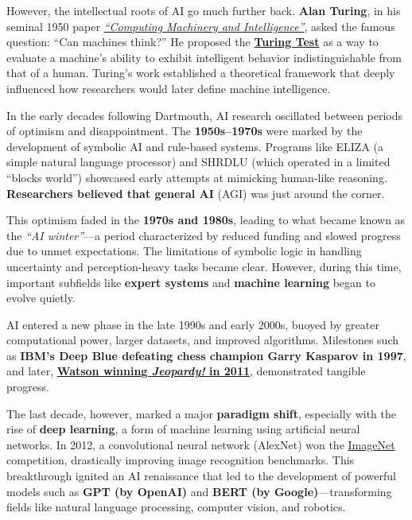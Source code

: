 \documentclass[
]{book}
\begin{document}
However, the intellectual roots of AI go much further back. \textbf{Alan Turing},
in his seminal 1950 paper \href{https://academic.oup.com/mind/article-abstract/LIX/236/433/986238?redirectedFrom=fulltext}{\emph{``Computing Machinery and Intelligence''}},
asked the
famous question: ``Can machines think?'' He proposed the \href{https://en.wikipedia.org/wiki/Turing_test}{\textbf{Turing Test}}
as a way to evaluate a machine's ability to exhibit intelligent behavior
indistinguishable from that of a human. Turing's work established a
theoretical framework that deeply influenced how researchers would later
define machine intelligence.

In the early decades following Dartmouth, AI research oscillated between
periods of optimism and disappointment.
The \textbf{1950s--1970s} were marked by the development of symbolic AI and
rule-based systems. Programs like ELIZA (a simple natural language processor)
and SHRDLU (which operated in a limited ``blocks world'') showcased early
attempts at mimicking human-like reasoning. \textbf{Researchers believed that general
AI} (AGI) was just around the corner.

This optimism faded in the \textbf{1970s and 1980s}, leading to what became known
as the \emph{``AI winter''}---a period characterized by reduced funding and slowed
progress due to unmet expectations. The limitations of symbolic logic
in handling uncertainty and perception-heavy tasks became clear.
However, during this time, important subfields like \textbf{expert systems}
and \textbf{machine learning} began to evolve quietly.

AI entered a new phase in the late 1990s and early 2000s, buoyed by greater
computational power, larger datasets, and improved algorithms.
Milestones such as
\textbf{IBM's Deep Blue defeating chess champion Garry Kasparov in 1997},
and later, \href{https://www.youtube.com/watch?v=KF6sLCeBj0s&ab_channel=BBCNews}{\textbf{Watson winning \emph{Jeopardy!} in 2011}},
demonstrated tangible progress.

The last decade, however, marked a major \textbf{paradigm shift}, especially with
the rise of \textbf{deep learning}, a form of machine learning using artificial
neural networks. In 2012, a convolutional neural network (AlexNet) won the
\href{https://www.image-net.org/challenges/LSVRC/}{ImageNet} competition,
drastically improving image recognition benchmarks.
This breakthrough ignited an AI renaissance that led to the development
of powerful models such as \textbf{GPT (by OpenAI)} and \textbf{BERT (by Google)}---transforming
fields like natural language processing, computer vision, and robotics.
\end{document}
